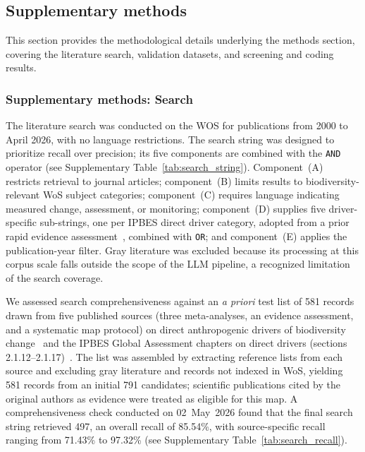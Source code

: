 \documentclass[12pt]{article}
\begin{document}
\newpage
\subsection*{Supplementary methods}
This section provides the methodological details underlying the methods section, covering the literature search, validation datasets, and screening and coding results. 

\newpage
\subsubsection*{Supplementary methods: Search}
\label{smethods:search}
The literature search was conducted on the WOS for publications from 2000 to April 2026, with no language restrictions. The search string was designed to prioritize recall over precision; its five components are combined with the \texttt{AND} operator (see Supplementary Table~\ref{tab:search_string}). Component~(A) restricts retrieval to journal articles; component~(B) limits results to biodiversity-relevant WoS subject categories; component~(C) requires language indicating measured change, assessment, or monitoring; component~(D) supplies five driver-specific sub-strings, one per IPBES direct driver category, adopted from a prior rapid evidence assessment~\cite{jaureguiberry_direct_2022}, combined with \texttt{OR}; and component~(E) applies the publication-year filter. Gray literature was excluded because its processing at this corpus scale falls outside the scope of the LLM pipeline, a recognized limitation of the search coverage.

We assessed search comprehensiveness against an \emph{a priori} test list of 581 records drawn from five published sources (three meta-analyses, an evidence assessment, and a systematic map protocol) on direct anthropogenic drivers of biodiversity change~\cite{moullec_identifying_2021, jaureguiberry_direct_2022, beckmann_conventional_2019, benitez-lopez_impact_2017, urban_accelerating_2015} and the IPBES Global Assessment chapters on direct drivers (sections 2.1.12--2.1.17)~\cite{balvanera_chapter_2019}. The list was assembled by extracting reference lists from each source and excluding gray literature and records not indexed in WoS, yielding 581 records from an initial 791 candidates; scientific publications cited by the original authors as evidence were treated as eligible for this map. A comprehensiveness check conducted on 02~May~2026 found that the final search string retrieved 497, an overall recall of 85.54\%, with source-specific recall ranging from 71.43\% to 97.32\% (see Supplementary Table~\ref{tab:search_recall}).
\end{document}
